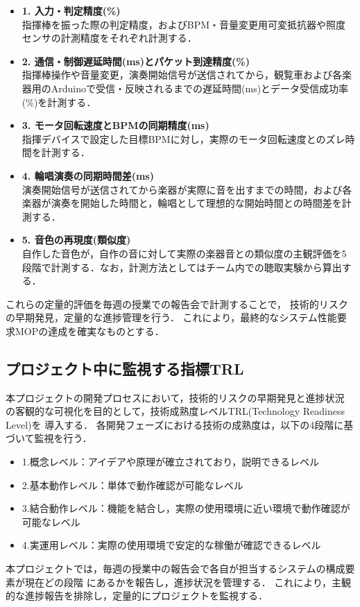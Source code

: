 \documentclass[lualatex,book,paper=a4paper,jafontsize=11.5pt,jafontscale=1.05]{jlreq}
\begin{document}
\begin{itemize}
	\item \textbf{1. 入力・判定精度(\%)}
		\\ 指揮棒を振った際の判定精度，およびBPM・音量変更用可変抵抗器や照度センサの計測精度をそれぞれ計測する．
	
	\item \textbf{2. 通信・制御遅延時間(ms)とパケット到達精度(\%)}
		\\ 指揮棒操作や音量変更，演奏開始信号が送信されてから，観覧車および各楽器用のArduinoで受信・反映されるまでの遅延時間(ms)とデータ受信成功率(\%)を計測する．
	
	\item \textbf{3. モータ回転速度とBPMの同期精度(ms)}
	\\ 指揮デバイスで設定した目標BPMに対し，実際のモータ回転速度とのズレ時間を計測する．
	
	\item \textbf{4. 輪唱演奏の同期時間差(ms)}
	\\ 演奏開始信号が送信されてから楽器が実際に音を出すまでの時間，および各楽器が演奏を開始した時間と，輪唱として理想的な開始時間との時間差を計測する．
	
\item \textbf{5. 音色の再現度(類似度)}
	\\ 自作した音色が，自作の音に対して実際の楽器音との類似度の主観評価を5段階で計測する．なお，計測方法としてはチーム内での聴取実験から算出する．
\end{itemize}

これらの定量的評価を毎週の授業での報告会で計測することで，
技術的リスクの早期発見，定量的な進捗管理を行う．
これにより，最終的なシステム性能要求MOPの達成を確実なものとする．

\subsection{プロジェクト中に監視する指標TRL}
本プロジェクトの開発プロセスにおいて，技術的リスクの早期発見と進捗状況
の客観的な可視化を目的として，技術成熟度レベルTRL(Technology Readiness Level)を
導入する．
各開発フェーズにおける技術の成熟度は，以下の4段階に基づいて監視を行う．
\begin{itemize}
	\item 1.概念レベル：アイデアや原理が確立されており，説明できるレベル
	\item 2.基本動作レベル：単体で動作確認が可能なレベル
	\item 3.結合動作レベル：機能を結合し，実際の使用環境に近い環境で動作確認が可能なレベル
	\item 4.実運用レベル：実際の使用環境で安定的な稼働が確認できるレベル
\end{itemize}
本プロジェクトでは，毎週の授業中の報告会で各自が担当するシステムの構成要素が現在どの段階
にあるかを報告し，進捗状況を管理する．
これにより，主観的な進捗報告を排除し，定量的にプロジェクトを監視する．
\end{document}

